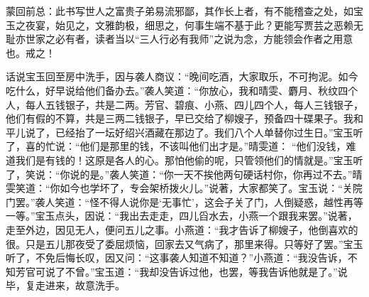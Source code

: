 \begin{parag}
    \begin{note}蒙回前总：此书写世人之富贵子弟易流邪鄙，其作长上者，有不能稽查之处，如宝玉之夜宴，始见之，文雅韵极，细思之，何事生端不基于此？更能写贾芸之恶赖无耻亦世家之必有者，读者当以“三人行必有我师”之说为念，方能领会作者之用意也。戒之！\end{note}
\end{parag}


\begin{parag}
    话说宝玉回至房中洗手，因与袭人商议：“晚间吃酒，大家取乐，不可拘泥。如今吃什么，好早说给他们备办去。”袭人笑道：“你放心，我和晴雯、麝月、秋纹四个人，每人五钱银子，共是二两。芳官、碧痕、小燕、四儿四个人，每人三钱银子，他们有假的不算，共是三两二钱银子，早已交给了柳嫂子，预备四十碟果子。我和平儿说了，已经抬了一坛好绍兴酒藏在那边了。我们八个人单替你过生日。”宝玉听了，喜的忙说：“他们是那里的钱，不该叫他们出才是。”晴雯道： “他们没钱，难道我们是有钱的！这原是各人的心。那怕他偷的呢，只管领他们的情就是。”宝玉听了，笑说：“你说的是。”袭人笑道：“你一天不挨他两句硬话村你，你再过不去。”晴雯笑道：“你如今也学坏了，专会架桥拨火儿。”说著，大家都笑了。宝玉说：“关院门罢。”袭人笑道：“怪不得人说你是‘无事忙’，这会子关了门，人倒疑惑，越性再等一等。”宝玉点头，因说：“我出去走走，四儿舀水去，小燕一个跟我来罢。”说著，走至外边，因见无人，便问五儿之事。小燕道：“我才告诉了柳嫂子，他倒喜欢的很。只是五儿那夜受了委屈烦恼，回家去又气病了，那里来得。只等好了罢。”宝玉听了，不免后悔长叹，因又问：“这事袭人知道不知道？”小燕道：“我没告诉，不知芳官可说了不曾。”宝玉道：“我却没告诉过他，也罢，等我告诉他就是了。”说毕，复走进来，故意洗手。
\end{parag}


